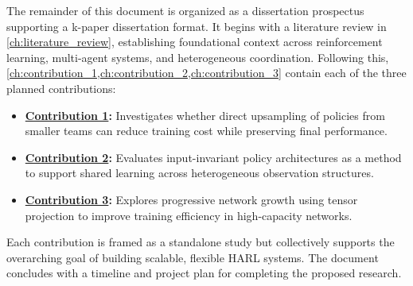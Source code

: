 \begin{comment} %
The remainder of this document is designed to systematically explore 
the complex field of multi-agent reinforcement learning, 
particularly focusing on heterogeneous-agent systems.
Following this introductory chapter, 
\ref{ch:literature_review}: Literature Review provides a comprehensive analysis 
of the seminal and recent literature pertinent to our research focus. 
\Cref{ch:methodology} details the experimental and analytical techniques 
employed. \Cref{ch:results} presents the data and findings from our research, 
followed by \cref{ch:discussion}, where these results are interpreted 
in the context of existing knowledge and their implications for future 
research are explored.
The \emph{dissertation} will conclude with~\cref{ch:conclusion}, 
which summarizes the research and suggests avenues for further investigation. 
Each chapter builds upon the previous to provide a comprehensive understanding 
of the topic, aiming to contribute valuable insights to the field of \gls{harl}.
\end{comment}

The remainder of this document is organized as a dissertation prospectus 
supporting a k-paper dissertation format. It begins with a literature review in 
\cref{ch:literature_review}, establishing foundational context across reinforcement 
learning, multi-agent systems, and heterogeneous coordination. 
Following this, \cref{ch:contribution_1,ch:contribution_2,ch:contribution_3} 
contain each of the three planned contributions:
\begin{itemize}
    \item \textbf{\hyperref[ch:contribution_1]{Contribution 1}:} Investigates whether direct 
        upsampling of policies from smaller teams can reduce training cost while preserving 
        final performance.
    \item \textbf{\hyperref[ch:contribution_2]{Contribution 2}:} Evaluates input-invariant 
        policy architectures as a method to support shared learning across heterogeneous 
        observation structures.
    \item \textbf{\hyperref[ch:contribution_3]{Contribution 3}:} Explores progressive network 
        growth using tensor projection to improve training efficiency in high-capacity networks.
\end{itemize}
Each contribution is framed as a standalone study but collectively supports 
the overarching goal of building scalable, flexible HARL systems. 
The document concludes with a timeline and project plan for completing the proposed research.